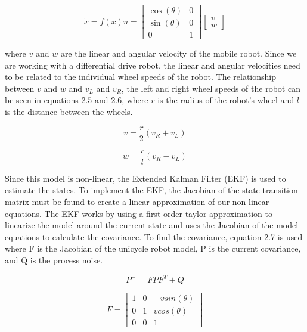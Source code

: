 \begin{equation}
  \dot{x} = f(x)u = 
  \begin{bmatrix}
      \cos(\theta) & 0 \\
      \sin(\theta) & 0 \\
      0 & 1
  \end{bmatrix}
  \begin{bmatrix}
      v \\
      w
  \end{bmatrix}
\end{equation}

where $v$ and $w$ are the linear and angular velocity of the mobile robot. Since we 
are working with a differential drive robot, the linear and angular velocities need 
to be related to the individual wheel speeds of the robot. The relationship 
between $v$ and $w$ and $v_L$ and $v_R$, the left and right wheel speeds of the robot 
can be seen in equations 2.5 and 2.6, where $r$ is the radius of the robot's wheel and 
$l$ is the distance between the wheels. 

\begin{equation}
  v = \frac{r}{2} (v_R + v_L)
\end{equation}

\begin{equation}
  w = \frac{r}{l} (v_R - v_L)
\end{equation}

Since this model is non-linear, the Extended Kalman Filter (EKF) is used to estimate 
the states. To implement the EKF, the Jacobian of the state transition matrix must be 
found to create a linear approximation of our non-linear equations. The EKF works by 
using a first order taylor approximation to linearize the model around the current 
state and uses the Jacobian of the model equations to calculate the covariance. To 
find the covariance, equation 2.7 is used where F is the Jacobian of the unicycle 
robot model, P is the current covariance, and Q is the process noise. 

\begin{equation}
  P^- = FPF^T + Q
\end{equation}

\begin{equation}
  F = \begin{bmatrix}
    1 & 0 & -vsin(\theta) \\
    0 & 1 &  vcos(\theta) \\
    0 & 0 &       1
  \end{bmatrix}
\end{equation}

